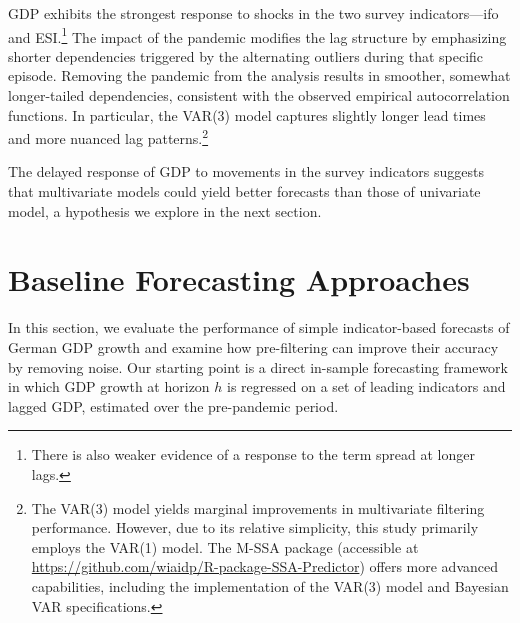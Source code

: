 \documentclass[11pt,a4paper]{article}
\begin{document}


%

GDP exhibits the strongest response to shocks in the two survey indicators—ifo and ESI.\footnote{There is also weaker evidence of a response to the term spread at longer lags.} The impact of the pandemic modifies the lag structure by emphasizing shorter dependencies triggered by the alternating outliers during that specific episode. Removing the pandemic from the analysis results in smoother, somewhat longer-tailed dependencies, consistent with the observed empirical autocorrelation functions. In particular, the VAR(3) model captures slightly longer lead times and more nuanced lag patterns.\footnote{The VAR(3) model yields marginal improvements in multivariate filtering performance. However, due to its relative simplicity, this study primarily employs the VAR(1) model. The M-SSA package (accessible at \url{https://github.com/wiaidp/R-package-SSA-Predictor}) offers more advanced capabilities, including the implementation of the VAR(3) model and Bayesian VAR specifications.} 

The delayed response of GDP to movements in the survey indicators suggests that multivariate models could yield better forecasts than those of univariate model, a hypothesis we explore in the next section.


\section{Baseline Forecasting Approaches}
\label{sec:direct_forecast}

In this section, we evaluate the performance of simple indicator-based forecasts of German GDP growth and examine how pre-filtering can improve their accuracy by removing noise. 
Our starting point is a direct in-sample forecasting framework in which GDP growth at horizon $h$ is regressed on a set of leading indicators and lagged GDP, estimated over the pre-pandemic period.
\end{document}
